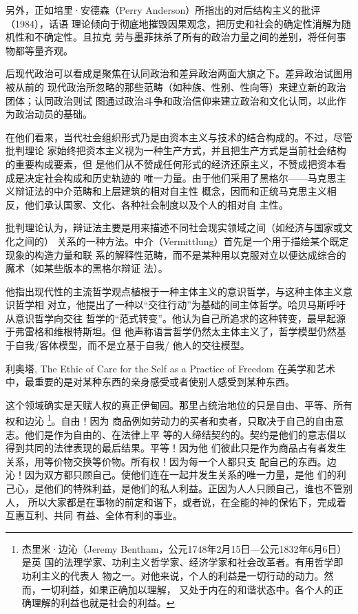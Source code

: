 另外，正如培里·安德森（Perry Anderson）所指出的对后结构主义的批评（1984），话语
理论倾向于彻底地摧毁因果观念，把历史和社会的确定性消解为随机性和不确定性。且拉克
劳与墨菲抹杀了所有的政治力量之间的差别，将任何事物都等量齐观。

后现代政治可以看成是聚焦在认同政治和差异政治两面大旗之下。差异政治试图用被从前的
现代政治所忽略的那些范畴（如种族、性别、性向等）来建立新的政治团体；认同政治则试
图通过政治斗争和政治信仰来建立政治和文化认同，以此作为政治动员的基础。


在他们看来，当代社会组织形式乃是由资本主义与技术的结合构成的。不过，尽管批判理论
家始终把资本主义视为一种生产方式，并且把生产方式是当前社会结构的重要构成要素，但
是他们从不赞成任何形式的经济还原主义，不赞成把资本看成是决定社会构成和历史轨迹的
唯一力量。由于他们采用了黑格尔——马克思主义辩证法的中介范畴和上层建筑的相对自主性
概念，因而和正统马克思主义相反，他们承认国家、文化、各种社会制度以及个人的相对自
主性。

批判理论认为，辩证法主要是用来描述不同社会现实领域之间（如经济与国家或文化之间的）
关系的一种方法。中介（Vermittlung）首先是一个用于描绘某个既定现象的构造力量和联
系的解释性范畴，而不是某种用以克服对立以便达成综合的魔术（如某些版本的黑格尔辩证
法）。

他指出现代性的主流哲学观点植根于一种主体主义的意识哲学，与这种主体主义意识哲学相
对立，他提出了一种以“交往行动”为基础的间主体哲学。哈贝马斯呼吁从意识哲学向交往
哲学的“范式转变”。他认为自己所追求的这种转变，最早起源于弗雷格和维根特斯坦。但
他声称语言哲学仍然太主体主义了，哲学模型仍然基于自我/客体模型，而不是立基于自我/
他人的交往模型。

利奥塔, The Ethic of Care for the Self as a Practice of Freedom 
在美学和艺术中，最重要的是对某种东西的亲身感受或者使别人感受到某种东西。




这个领域确实是天赋人权的真正伊甸园。那里占统治地位的只是自由、平等、所有权和边沁
\footnote{杰里米·边沁（Jeremy Bentham，公元1748年2月15日—公元1832年6月6日）是英
  国的法理学家、功利主义哲学家、经济学家和社会改革者。有用哲学即功利主义的代表人
  物之一。对他来说，个人的利益是一切行动的动力。然而，一切利益，如果正确加以理解，
  又处于内在的和谐状态中。各个人的正确理解的利益也就是社会的利益。}。自由！因为
商品例如劳动力的买者和卖者，只取决于自己的自由意志。他们是作为自由的、在法律上平
等的人缔结契约的。契约是他们的意志借以得到共同的法律表现的最后结果。平等！因为他
们彼此只是作为商品占有者发生关系，用等价物交换等价物。所有权！因为每一个人都只支
配自己的东西。边沁！因为双方都只顾自己。使他们连在一起并发生关系的唯一力量，是他
们的利己心，是他们的特殊利益，是他们的私人利益。正因为人人只顾自己，谁也不管别人，
所以大家都是在事物的前定和谐下，或者说，在全能的神的保佑下，完成着互惠互利、共同
有益、全体有利的事业。